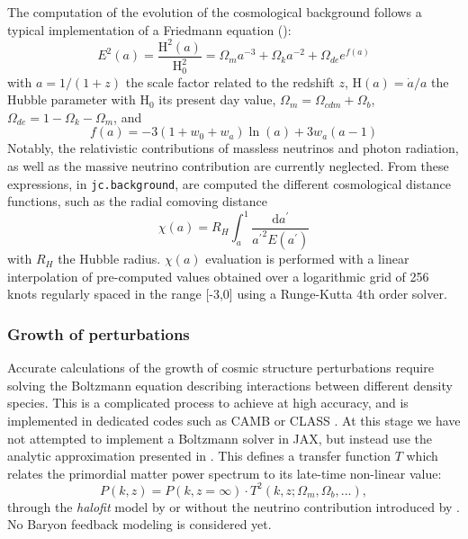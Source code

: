 \documentclass[twocolumn,twocolappendix,nofootinbib,iop]{openjournal}
\newcommand{\resubnote}[1]{#1} %
\begin{document}
The computation of the evolution of the cosmological background follows a typical implementation of a Friedmann equation (\citealp[see e.g.][]{2005A&A...443..819P}):
\begin{equation}
    E^2(a) = \frac{\mathrm{H}^2(a)}{\mathrm{H}^2_0} = \Omega_m a^{-3} + \Omega_k a^{-2} + \Omega_{de} e^{f(a)}
\end{equation}
with $a=1/(1+z)$ the scale factor related to the redshift $z$, $\mathrm{H}(a)=\dot{a}/a$ the Hubble parameter with $\mathrm{H}_0$ its present day value, $\Omega_m= \Omega_{cdm}+\Omega_b$, $\Omega_{de}=1-\Omega_k-\Omega_m$, and 
\begin{equation}
    f(a) = -3 (1 + w_0 + w_a) \ln(a) + 3 w_a (a - 1)
\end{equation}
Notably, the relativistic contributions of massless neutrinos and photon radiation, as well as the massive neutrino contribution are currently neglected. From these expressions, in \texttt{jc.background}, are computed the different cosmological distance functions, such as the radial comoving distance
\begin{equation}
     \chi(a) =  R_H \int_a^1 \frac{\mathrm{d}a^\prime}{{a^\prime}^2 E(a^\prime)}
     \label{eq:radial_comoving}
\end{equation}
with $R_H$ the Hubble radius.  \resubnote{$\chi(a)$ evaluation is performed with a linear interpolation of pre-computed values obtained over a logarithmic grid of 256 knots regularly spaced in the range [-3,0] using a Runge-Kutta 4th order solver.}


%
\subsubsection{Growth of perturbations}
\resubnote{Accurate calculations of the growth of cosmic structure perturbations require solving the Boltzmann equation describing interactions between different density species. This is a complicated process to achieve at high accuracy, and is implemented in dedicated codes such as CAMB \citep{camb} or CLASS \citep{2011JCAP...07..034B}. At this stage we have not attempted to implement a Boltzmann solver in JAX, but instead use the analytic approximation presented in \citet{Eisenstein_1998}. This defines a transfer function $T$} which relates the primordial matter power spectrum to its late-time non-linear value:
\begin{equation}
    P(k, z) = P(k, z=\infty) \cdot T^2(k, z; \Omega_m, \Omega_b, ...),
\end{equation}
through the \textit{halofit} model by \cite{2012ApJ...761..152T} or \cite{2003MNRAS.341.1311S} without the neutrino contribution introduced by \cite{10.1111/j.1365-2966.2011.20222.x}. No Baryon feedback modeling is considered yet. 
\end{document}
